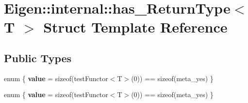 \hypertarget{struct_eigen_1_1internal_1_1has___return_type}{}\section{Eigen\+:\+:internal\+:\+:has\+\_\+\+Return\+Type$<$ T $>$ Struct Template Reference}
\label{struct_eigen_1_1internal_1_1has___return_type}
\subsection*{Public Types}
\begin{DoxyCompactItemize}
\item 
\mbox{\label{struct_eigen_1_1internal_1_1has___return_type_a9424bb23fc61bc7cf0b1c28100a80cae}} 
enum \{ {\bfseries value} = sizeof(test\+Functor$<$T$>$(0)) == sizeof(meta\+\_\+yes)
 \}
\item 
\mbox{\label{struct_eigen_1_1internal_1_1has___return_type_a3ebece4cb86b42b13a0cf74f63701288}} 
enum \{ {\bfseries value} = sizeof(test\+Functor$<$T$>$(0)) == sizeof(meta\+\_\+yes)
 \}
\end{DoxyCompactItemize}
